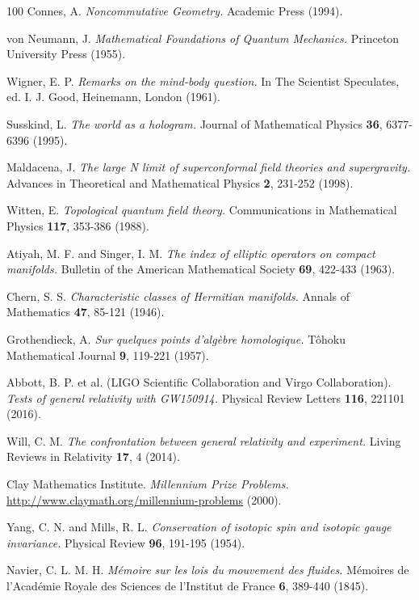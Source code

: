 \documentclass[11pt]{article}
\theoremstyle{definition}
\begin{document}
\begin{thebibliography}{100}
Connes, A.
\textit{Noncommutative Geometry.}
Academic Press (1994).

von Neumann, J.
\textit{Mathematical Foundations of Quantum Mechanics.}
Princeton University Press (1955).

Wigner, E. P.
\textit{Remarks on the mind-body question.}
In The Scientist Speculates, ed. I. J. Good, Heinemann, London (1961).

Susskind, L.
\textit{The world as a hologram.}
Journal of Mathematical Physics \textbf{36}, 6377-6396 (1995).

Maldacena, J.
\textit{The large N limit of superconformal field theories and supergravity.}
Advances in Theoretical and Mathematical Physics \textbf{2}, 231-252 (1998).

Witten, E.
\textit{Topological quantum field theory.}
Communications in Mathematical Physics \textbf{117}, 353-386 (1988).

Atiyah, M. F. and Singer, I. M.
\textit{The index of elliptic operators on compact manifolds.}
Bulletin of the American Mathematical Society \textbf{69}, 422-433 (1963).

Chern, S. S.
\textit{Characteristic classes of Hermitian manifolds.}
Annals of Mathematics \textbf{47}, 85-121 (1946).

Grothendieck, A.
\textit{Sur quelques points d'algèbre homologique.}
Tôhoku Mathematical Journal \textbf{9}, 119-221 (1957).

Abbott, B. P. et al. (LIGO Scientific Collaboration and Virgo Collaboration).
\textit{Tests of general relativity with GW150914.}
Physical Review Letters \textbf{116}, 221101 (2016).

Will, C. M.
\textit{The confrontation between general relativity and experiment.}
Living Reviews in Relativity \textbf{17}, 4 (2014).

Clay Mathematics Institute.
\textit{Millennium Prize Problems.}
\url{http://www.claymath.org/millennium-problems} (2000).

Yang, C. N. and Mills, R. L.
\textit{Conservation of isotopic spin and isotopic gauge invariance.}
Physical Review \textbf{96}, 191-195 (1954).

Navier, C. L. M. H.
\textit{Mémoire sur les lois du mouvement des fluides.}
Mémoires de l'Académie Royale des Sciences de l'Institut de France \textbf{6}, 389-440 (1845).


\end{thebibliography}
\end{document}
